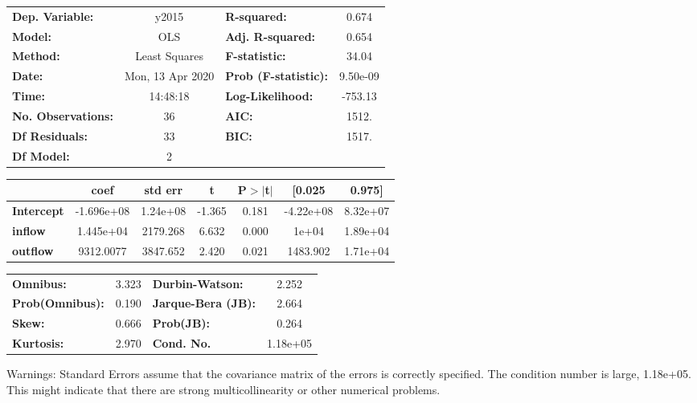 \begin{center}
\begin{tabular}{lclc}
\toprule
\textbf{Dep. Variable:}    &      y2015       & \textbf{  R-squared:         } &     0.674   \\
\textbf{Model:}            &       OLS        & \textbf{  Adj. R-squared:    } &     0.654   \\
\textbf{Method:}           &  Least Squares   & \textbf{  F-statistic:       } &     34.04   \\
\textbf{Date:}             & Mon, 13 Apr 2020 & \textbf{  Prob (F-statistic):} &  9.50e-09   \\
\textbf{Time:}             &     14:48:18     & \textbf{  Log-Likelihood:    } &   -753.13   \\
\textbf{No. Observations:} &          36      & \textbf{  AIC:               } &     1512.   \\
\textbf{Df Residuals:}     &          33      & \textbf{  BIC:               } &     1517.   \\
\textbf{Df Model:}         &           2      & \textbf{                     } &             \\
\bottomrule
\end{tabular}
\begin{tabular}{lcccccc}
                   & \textbf{coef} & \textbf{std err} & \textbf{t} & \textbf{P$> |$t$|$} & \textbf{[0.025} & \textbf{0.975]}  \\
\midrule
\textbf{Intercept} &   -1.696e+08  &     1.24e+08     &    -1.365  &         0.181        &    -4.22e+08    &     8.32e+07     \\
\textbf{inflow}    &    1.445e+04  &     2179.268     &     6.632  &         0.000        &        1e+04    &     1.89e+04     \\
\textbf{outflow}   &    9312.0077  &     3847.652     &     2.420  &         0.021        &     1483.902    &     1.71e+04     \\
\bottomrule
\end{tabular}
\begin{tabular}{lclc}
\textbf{Omnibus:}       &  3.323 & \textbf{  Durbin-Watson:     } &    2.252  \\
\textbf{Prob(Omnibus):} &  0.190 & \textbf{  Jarque-Bera (JB):  } &    2.664  \\
\textbf{Skew:}          &  0.666 & \textbf{  Prob(JB):          } &    0.264  \\
\textbf{Kurtosis:}      &  2.970 & \textbf{  Cond. No.          } & 1.18e+05  \\
\bottomrule
\end{tabular}
\end{center}

Warnings: \newline
 [1] Standard Errors assume that the covariance matrix of the errors is correctly specified. \newline
 [2] The condition number is large, 1.18e+05. This might indicate that there are \newline
 strong multicollinearity or other numerical problems.